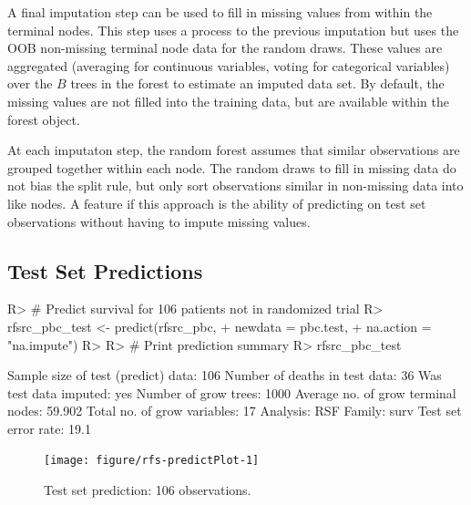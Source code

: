 \documentclass[nojss]{jss}\usepackage[]{graphicx}\usepackage[]{color}
\begin{document}
A final imputation step can be used to fill in missing values from within the terminal nodes. This step uses a process to the previous imputation but uses the OOB non-missing terminal node data for the random draws. These values are aggregated (averaging for continuous variables, voting for categorical variables) over the $B$ trees in the forest to estimate an imputed data set. By default, the missing values are not filled into the training data, but are available within the forest object.

At each imputaton step, the random forest assumes that similar observations are grouped together within each node. The random draws to fill in missing data do not bias the split rule, but only sort observations similar in non-missing data into like nodes. A feature if this approach is the ability of predicting on test set observations without having to impute missing values. 

\subsection{Test Set Predictions}

\begin{Schunk}
\begin{Sinput}
R> # Predict survival for 106 patients not in randomized trial
R> rfsrc_pbc_test <- predict(rfsrc_pbc, 
+                     newdata = pbc.test,
+                     na.action = "na.impute")
R> 
R> # Print prediction summary  
R> rfsrc_pbc_test
\end{Sinput}
\end{Schunk}
\begin{Schunk}
\begin{Soutput}
  Sample size of test (predict) data: 106
       Number of deaths in test data: 36
               Was test data imputed: yes
                Number of grow trees: 1000
  Average no. of grow terminal nodes: 59.902
         Total no. of grow variables: 17
                            Analysis: RSF
                              Family: surv
                 Test set error rate: 19.1%
\end{Soutput}
\end{Schunk}

\begin{Schunk}
\begin{figure}[!htpb]

{\centering \texttt{[image: figure/rfs-predictPlot-1]} 

}

\caption[Test set prediction]{Test set prediction: 106 observations.\label{fig:predictPlot}}
\end{figure}
\end{Schunk}
\end{document}
